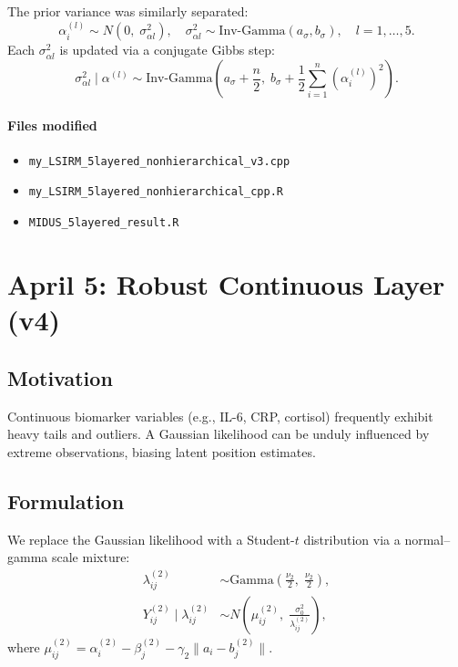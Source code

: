 \documentclass[11pt]{article}
\begin{document}
The prior variance was similarly separated:
\[
  \alpha_i^{(l)} \sim N(0,\;\sigma_{\alpha l}^2), \quad
  \sigma_{\alpha l}^2 \sim \text{Inv-Gamma}(a_\sigma, b_\sigma), \quad l=1,\dots,5.
\]
Each $\sigma_{\alpha l}^2$ is updated via a conjugate Gibbs step:
\[
  \sigma_{\alpha l}^2 \mid \alpha^{(l)} \sim \text{Inv-Gamma}\!\left(a_\sigma + \frac{n}{2},\; b_\sigma + \frac{1}{2}\sum_{i=1}^n (\alpha_i^{(l)})^2\right).
\]

\paragraph{Files modified}
\begin{itemize}[leftmargin=1.5em]
  \item \texttt{my\_LSIRM\_5layered\_nonhierarchical\_v3.cpp}
  \item \texttt{my\_LSIRM\_5layered\_nonhierarchical\_cpp.R}
  \item \texttt{MIDUS\_5layered\_result.R}
\end{itemize}


\section{April 5: Robust Continuous Layer (v4)}

\subsection{Motivation}

Continuous biomarker variables (e.g., IL-6, CRP, cortisol) frequently exhibit heavy tails and outliers.
A Gaussian likelihood can be unduly influenced by extreme observations, biasing latent position estimates.

\subsection{Formulation}

We replace the Gaussian likelihood with a Student-$t$ distribution via a normal--gamma scale mixture:
\begin{align}
  \lambda_{ij}^{(2)} &\sim \text{Gamma}\!\left(\frac{\nu_2}{2},\;\frac{\nu_2}{2}\right), \\[4pt]
  Y_{ij}^{(2)} \mid \lambda_{ij}^{(2)} &\sim N\!\left(\mu_{ij}^{(2)},\;\frac{\sigma_0^2}{\lambda_{ij}^{(2)}}\right),
\end{align}
where $\mu_{ij}^{(2)} = \alpha_i^{(2)} - \beta_j^{(2)} - \gamma_2\|a_i - b_j^{(2)}\|$.
\end{document}
